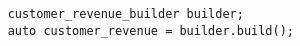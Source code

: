 \begin{verbatim}
    customer_revenue_builder builder;
    auto customer_revenue = builder.build();
\end{verbatim}